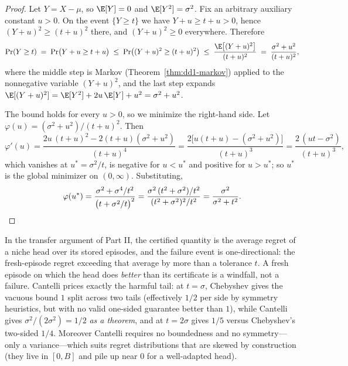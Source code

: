 \begin{proof}
Let $Y = X - \mu$, so $\E[Y] = 0$ and $\E[Y^2] = \sigma^2$. Fix an arbitrary
auxiliary constant $u > 0$. On the event $\{Y \ge t\}$ we have
$Y + u \ge t + u > 0$, hence $(Y + u)^2 \ge (t + u)^2$ there, and
$(Y+u)^2 \ge 0$ everywhere. Therefore
\[
\Pr( Y \ge t )
\;=\; \Pr\bigl( Y + u \ge t + u \bigr)
\;\le\; \Pr\bigl( (Y + u)^2 \ge (t + u)^2 \bigr)
\;\le\; \frac{\E\bigl[(Y + u)^2\bigr]}{(t + u)^2}
\;=\; \frac{\sigma^2 + u^2}{(t + u)^2},
\]
where the middle step is Markov (Theorem~\ref{thm:dd1-markov}) applied to the
nonnegative variable $(Y + u)^2$, and the last step expands
$\E[(Y+u)^2] = \E[Y^2] + 2u\,\E[Y] + u^2 = \sigma^2 + u^2$.

The bound holds for every $u > 0$, so we minimize the right-hand side. Let
$\varphi(u) = (\sigma^2 + u^2)/(t + u)^2$. Then
\[
\varphi'(u)
= \frac{2u\,(t+u)^2 - 2(t+u)(\sigma^2 + u^2)}{(t+u)^4}
= \frac{2\bigl[u(t + u) - (\sigma^2 + u^2)\bigr]}{(t+u)^3}
= \frac{2\,(ut - \sigma^2)}{(t+u)^3},
\]
which vanishes at $u^* = \sigma^2 / t$, is negative for $u < u^*$ and positive
for $u > u^*$; so $u^*$ is the global minimizer on $(0, \infty)$.
Substituting,
\[
\varphi(u^*)
= \frac{\sigma^2 + \sigma^4/t^2}{\bigl(t + \sigma^2/t\bigr)^2}
= \frac{\sigma^2\,(t^2 + \sigma^2)/t^2}{(t^2 + \sigma^2)^2 / t^2}
= \frac{\sigma^2}{\sigma^2 + t^2}. \qedhere
\]
\end{proof}

\begin{remark}
\label{rem:dd1-onesided}
In the transfer argument of Part II, the certified quantity is the average
regret of a niche head over its stored episodes, and the failure event is
one-directional: the fresh-episode regret exceeding that average by more than
a tolerance $t$. A fresh episode on which the head does \emph{better} than
its certificate is a windfall, not a failure. Cantelli prices exactly the
harmful tail: at $t = \sigma$, Chebyshev gives the vacuous bound $1$ split
across two tails (effectively $1/2$ per side by symmetry heuristics, but with
no valid one-sided guarantee better than $1$), while Cantelli gives
$\sigma^2/(2\sigma^2) = 1/2$ \emph{as a theorem}, and at $t = 2\sigma$ gives
$1/5$ versus Chebyshev's two-sided $1/4$. Moreover Cantelli requires no
boundedness and no symmetry---only a variance---which suits regret
distributions that are skewed by construction (they live in $[0, B]$ and pile
up near $0$ for a well-adapted head).
\end{remark}

